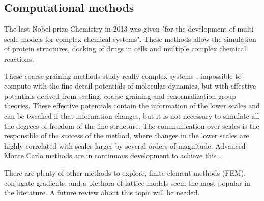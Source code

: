\subsection{Computational methods}
The last Nobel prize Chemistry in 2013 was given "for the development of multi-scale
models for complex chemical systems". These methods
allow the simulation of protein structures,  docking of drugs in cells and
multiple complex chemical reactions.

These coarse-graining methods study really complex
systems \citep{de_pablo_coarse-grained_2011}, impossible to compute with  the
fine detail potentials of molecular dynamics, but with effective potentials
derived from scaling, coarse graining and renormalization group theories. These
effective potentials contain the information of the lower scales and can be
tweaked if that information changes, but it is not necessary to simulate all the
degrees of freedom of the fine structure. The communication over scales is the
responsible of the success of the method, where changes in the lower scales are
highly correlated with scales larger by several orders of magnitude. Advanced
Monte Carlo methods are in continuous development to achieve this
\citep{karayiannis_novel_2002}.

There are plenty of other methods to explore, finite element methods (FEM),
conjugate gradients, and a plethora of lattice models seem the most popular in
the literature.  A future review about this topic will be needed.





